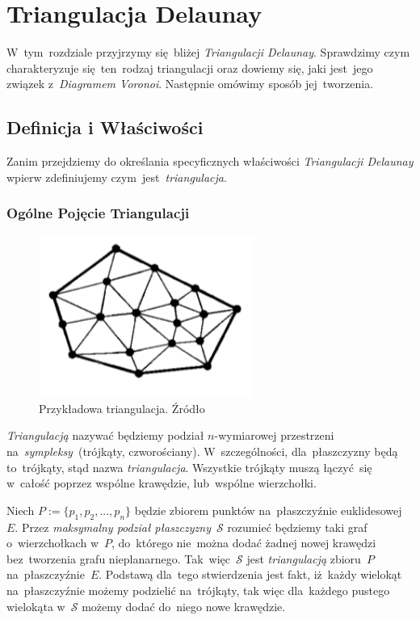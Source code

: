 \documentclass[skorowidz,autorrok,backref,xodstep,oswiadczenie]{wmimgr}
\begin{document}
\chapter{Triangulacja Delaunay}

W~tym~rozdziale przyjrzymy się~bliżej \emph{Triangulacji Delaunay}. Sprawdzimy czym charakteryzuje się~ten~rodzaj triangulacji oraz dowiemy się, jaki jest~jego związek z~\emph{Diagramem Voronoi}. Następnie omówimy sposób jej~tworzenia.

\section{Definicja i Właściwości}

Zanim przejdziemy do określania specyficznych właściwości \emph{Triangulacji Delaunay} wpierw zdefiniujemy czym~jest~\emph{triangulacja}.

\subsection{Ogólne Pojęcie Triangulacji}

\begin{figure}[ht!]
\centering
\includegraphics[width=70mm]{images/triangulacja1.png}
\caption{Przykładowa triangulacja. Źródło \cite{geometria}}
\label{triangulationexample}
\end{figure}

\emph{Triangulacją} nazywać będziemy podział $n$-wymiarowej przestrzeni na~\emph{sympleksy}~(trójkąty, czworościany). W~szczególności, dla~płaszczyzny będą to~trójkąty, stąd nazwa \emph{triangulacja}. Wszystkie trójkąty muszą łączyć~się w~całość poprzez wspólne krawędzie, lub~wspólne wierzchołki.

Niech $P:=\{ p_{1},p_{2},...,p_{n} \}$ będzie zbiorem punktów na~płaszczyźnie euklidesowej $E$. Przez \emph{maksymalny podział płaszczyzny}~$\mathcal{S}$ rozumieć będziemy taki graf o~wierzchołkach w~$P$, do~którego nie~można dodać żadnej nowej krawędzi bez~tworzenia grafu nieplanarnego. Tak~więc~$\mathcal{S}$ jest \emph{triangulacją} zbioru~$P$ na~płaszczyźnie~$E$. Podstawą dla~tego stwierdzenia jest fakt, iż~każdy wielokąt na~płaszczyźnie możemy podzielić na~trójkąty\cite{geometria}, tak więc dla~każdego pustego wielokąta w~$\mathcal{S}$ możemy dodać do~niego nowe krawędzie.
\end{document}
